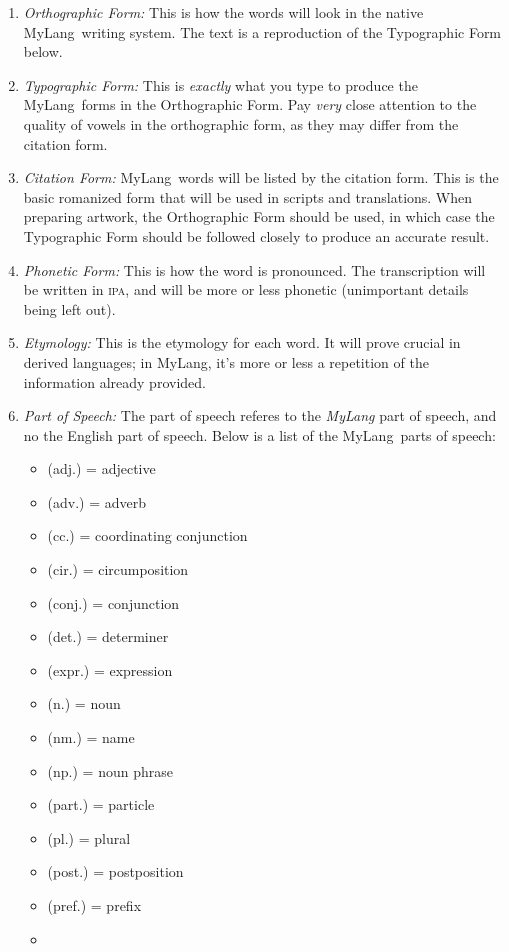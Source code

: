 \documentclass[oneside]{book}
\newcommand{\LanguageName}{MyLang}
\begin{document}
\begin{enumerate}
\item
\emph{Orthographic Form:}
This is how the words will look in the native \LanguageName\ writing system.
The text is a reproduction of the Typographic Form below.
\item
\emph{Typographic Form:}
This is \emph{exactly} what you type to produce the \LanguageName\ forms in the Orthographic Form.
Pay \emph{very} close attention to the quality of vowels in the orthographic form, as they may differ from the citation form.
\item
\emph{Citation Form:}
\LanguageName\ words will be listed by the citation form.
This is the basic romanized form that will be used in scripts and translations.
When preparing artwork, the Orthographic Form should be used, in which case the Typographic Form should be followed closely to produce an accurate result.
\item
\emph{Phonetic Form:}
This is how the word is pronounced.
The transcription will be written in \textsc{ipa}, and will be more or less phonetic (unimportant details being left out).
\item
\emph{Etymology:}
This is the etymology for each word.
It will prove crucial in derived languages;
in \LanguageName, it's more or less a repetition of the information already provided.
\item
\emph{Part of Speech:}
The part of speech referes to the \emph{\LanguageName} part of speech, and no the English part of speech.
Below is a list of the \LanguageName\ parts of speech:
\begin{itemize}
\item
(adj.) = adjective
\item
(adv.) = adverb
\item
(cc.) = coordinating conjunction
\item
(cir.) = circumposition
\item
(conj.) = conjunction
\item
(det.) = determiner
\item
(expr.) = expression
\item
(n.) = noun
\item
(nm.) = name
\item
(np.) = noun phrase
\item
(part.) = particle
\item
(pl.) = plural
\item
(post.) = postposition
\item
(pref.) = prefix
\item

\end{itemize}
\end{enumerate}
\end{document}

